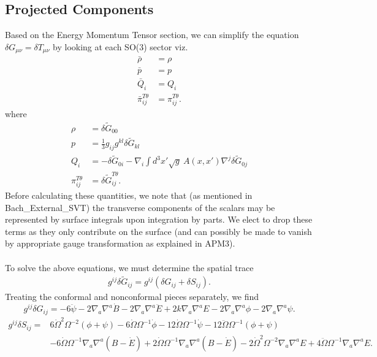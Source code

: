 \documentclass[10pt,letterpaper]{article}
\numberwithin{equation}{subsection}
\begin{document}
\subsection{Projected Components}
Based on the Energy Momentum Tensor section, we can simplify the equation $\delta G_{\mu\nu} = \delta T_{\mu\nu}$ by looking at each SO(3) sector viz.
\begin{align}
\bar \rho &= \rho
\nonumber\\
\bar p &= p
\nonumber\\
\bar Q_i & = Q_i
\nonumber\\
\bar\pi_{ij}^{T\theta} &= \pi_{ij}^{T\theta}.
\end{align}
where
\begin{align}
\rho &= \delta \tilde G_{00}
\nonumber \\
p &=   \frac{1}{3}g_{ij}g^{kl} \delta \tilde G_{kl}
\nonumber \\
Q_i &= -\delta \tilde  G_{0i} - \nabla_i \int d^3x' \sqrt g\ A(x,x') \nabla^j  \delta \tilde G_{0j}
\nonumber\\
\pi_{ij}^{T\theta} &= \delta \tilde G_{ij}^{T\theta}.
\end{align}
Before calculating these quantities, we note that (as mentioned in Bach\_External\_SVT)  the transverse components of the scalars may be represented by surface integrals upon integration by parts. We elect to drop these terms as they only contribute on the surface (and can possibly be made to vanish by appropriate gauge transformation as explained in APM3). 
\\ \\
To solve the above equations, we must determine the spatial trace
\begin{align}
g^{ij}\delta \tilde G_{ij} = g^{ij} (\delta G_{ij} + \delta S_{ij}).
\end{align}
Treating the conformal and nonconformal pieces separately, we find
\begin{equation}
g^{ij}\delta G_{ij} = -6 \ddot \psi - 2 \nabla_a \nabla^a \dot B - 2 \nabla_a \nabla^a \ddot E + 2k \nabla_a \nabla^a E
-2\nabla_a \nabla^a\phi - 2\nabla_a \nabla^a\psi.
\end{equation}
\begin{align}
g^{ij} \delta S_{ij} ={}& 6\dot \Omega^2 \Omega^{-2}(\phi+\psi) - 6\dot\Omega \Omega^{-1}\dot\phi - 12\dot\Omega \Omega^{-1} \dot\psi
-12 \ddot \Omega \Omega^{-1}( \phi + \psi) 
\nonumber\\
&-6\dot\Omega \Omega^{-1} \nabla_a\nabla^a (B-\dot E) + 2\dot\Omega \Omega^{-1} \nabla_a\nabla^a (B-\dot E)
-2\dot \Omega^2 \Omega^{-2} \nabla_a\nabla^a E + 4\ddot\Omega \Omega^{-1} \nabla_a\nabla^a E.
\end{align}
\end{document}
